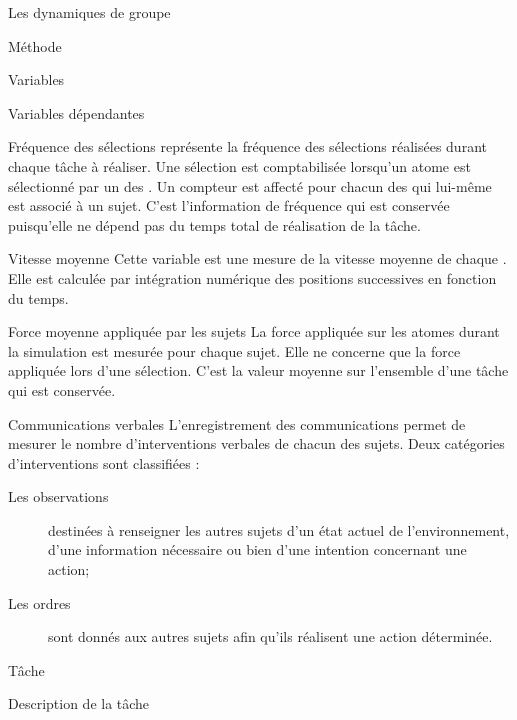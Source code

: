 \documentclass[myfrancais]{mythesis}
\begin{document}
\begin{mychapter}{Les dynamiques de groupe}
\begin{mysection}{Méthode}
\begin{mysubsection}{Variables}
\begin{mysubsubsection}{Variables dépendantes}
					\begin{myparagraph}{ Fréquence des sélections}
						 représente la fréquence des sélections réalisées durant chaque tâche à réaliser.
						Une sélection est comptabilisée lorsqu'un atome est sélectionné par un des .
						Un compteur est affecté pour chacun des  qui lui-même est associé à un sujet.
						C'est l'information de fréquence qui est conservée puisqu'elle ne dépend pas du temps total de réalisation de la tâche.
					\end{myparagraph}
					\begin{myparagraph}{ Vitesse moyenne}
						Cette variable est une mesure de la vitesse moyenne de chaque .
						Elle est calculée par intégration numérique des positions successives en fonction du temps.
					\end{myparagraph}
					\begin{myparagraph}{ Force moyenne appliquée par les sujets}
						La force appliquée sur les atomes durant la simulation est mesurée pour chaque sujet.
						Elle ne concerne que la force appliquée lors d'une sélection.
						C'est la valeur moyenne sur l'ensemble d'une tâche qui est conservée.
					\end{myparagraph}
					\begin{myparagraph}{ Communications verbales}
						L'enregistrement des communications permet de mesurer le nombre d'interventions verbales de chacun des sujets.
						Deux catégories d'interventions sont classifiées :
						\begin{description}
							\item[Les observations] destinées à renseigner les autres sujets d'un état actuel de l'environnement, d'une information nécessaire ou bien d'une intention concernant une action;
							\item[Les ordres] sont donnés aux autres sujets afin qu'ils réalisent une action déterminée.
						\end{description}
					\end{myparagraph}
				\end{mysubsubsection}
			\end{mysubsection}
			\begin{mysubsection}[sse-exp3-Tache]{Tâche}
				\begin{mysubsubsection}{Description de la tâche}

\end{mysubsubsection}
\end{mysubsection}
\end{mysection}
\end{mychapter}
\end{document}
